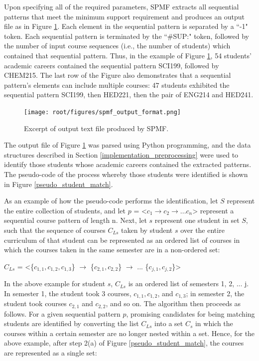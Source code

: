 Upon specifying all of the required parameters, SPMF extracts all sequential patterns that meet the minimum support requirement and produces an output file as in Figure \ref{spmf_output_format}.  Each element in the sequential pattern is separated by a ``-1" token.  Each sequential pattern is terminated by the ``\#SUP:" token, followed by the number of input course sequences (i.e., the number of students) which contained that sequential pattern.  Thus, in the example of Figure \ref{spmf_output_format}, 54 students' academic careers contained the sequential pattern SCI199, followed by CHEM215.  The last row of the Figure also demonstrates that a sequential pattern's elements can include multiple courses: 47 students exhibited the sequential pattern SCI199, then HED221, then the pair of ENG214 and HED241.

\begin{figure}[htbp]
\centering
\texttt{[image: root/figures/spmf\_output\_format.png]}
\caption{Excerpt of output text file produced by SPMF.}
\label{spmf_output_format}
\end{figure}

The output file of Figure \ref{spmf_output_format} was parsed using Python programming, and the data structures described in Section \ref{implementation_preprocessing} were used to identify those students whose academic careers contained the extracted patterns.  The pseudo-code of the process whereby those students were identified is shown in Figure \ref{pseudo_student_match}.  

As an example of how the pseudo-code performs the identification, let $S$ represent the entire collection of students, and let $p$ = \textless$c_1 \rightarrow c_2 \rightarrow ... c_n$\textgreater{} represent a sequential course pattern of length n.  Next, let $s$ represent one student in set $S$, such that the sequence of courses $C_{Ls}$ taken by student $s$ over the entire curriculum of that student can be represented as an ordered list of courses in which the courses taken in the same semester are in a non-ordered set:

$C_{Ls}$ = \textless\{$c_{1,1}, c_{1,2}, c_{1,3}$\} $\rightarrow$ \{$c_{2,1}, c_{2,2}$\} $\rightarrow$ ... \{$c_{j, 1}, c_{j,2}$\}\textgreater{}

In the above example for student $s$, $C_{Ls}$ is an ordered list of semesters 1, 2, ... j.  In semester 1, the student took 3 courses, $c_{1,1}, c_{1,2}$, and $c_{1,3}$; in semester 2, the student took courses $c_{2,1}$ and $c_{2,2}$, and so on.  The algorithm then proceeds as follows.  For a given sequential pattern $p$, promising candidates for being matching students are identified by converting the list $C_{Ls}$ into a set $C_s$ in which the courses within a certain semester are no longer nested within a set.  Hence, for the above example, after step 2(a) of Figure \ref{pseudo_student_match}, the courses are represented as a single set:


